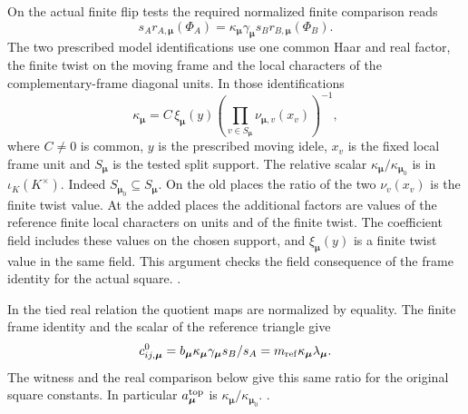 On the actual finite flip tests the required normalized
finite comparison reads
\[
 s_A r_{A,\boldsymbol\mu}(\Phi_A)
   =\kappa_{\boldsymbol\mu}\gamma_{\boldsymbol\mu}
                 s_B r_{B,\boldsymbol\mu}(\Phi_B).
\]
The two prescribed model identifications use one common Haar
and real factor, the finite twist on the moving frame and the
local characters of the complementary-frame diagonal units.
In those identifications
\[
 \kappa_{\boldsymbol\mu}=C\,
   \xi_{\boldsymbol\mu}(y)
   \left(\prod_{v\in S_{\boldsymbol\mu}}
                        \nu_{\boldsymbol\mu,v}(x_v)\right)^{-1},
\]
where \(C\ne0\) is common, \(y\) is the prescribed moving
idele, \(x_v\) is the fixed local frame unit and
\(S_{\boldsymbol\mu}\) is the tested split support.
The relative scalar \(\kappa_{\boldsymbol\mu}/
\kappa_{\boldsymbol\mu_0}\) is in \(\iota_K(K^\times)\).
Indeed \(S_{\boldsymbol\mu_0}\subseteq S_{\boldsymbol\mu}\).
On the old places the ratio of the two \(\nu_v(x_v)\)
is the finite twist value. At the added places the
additional factors are values of the reference finite local
characters on units and of the finite twist. The coefficient
field includes these values on the chosen support, and
\(\xi_{\boldsymbol\mu}(y)\) is a finite twist value in the
same field. This argument checks the field consequence
of the frame identity for the actual square.
.

In the tied real relation the quotient maps are normalized
by equality. The finite frame identity and the scalar
of the reference triangle give
\[
 c^0_{ij,\boldsymbol\mu}
   = b_{\boldsymbol\mu}\kappa_{\boldsymbol\mu}
       \gamma_{\boldsymbol\mu}s_B/s_A
   = m_{\rm ref}\kappa_{\boldsymbol\mu}\lambda_{\boldsymbol\mu}.
\]
The witness and the real comparison below give this
same ratio for the original square constants. In
particular \(a^{\rm top}_{\boldsymbol\mu}\) is
\(\kappa_{\boldsymbol\mu}/\kappa_{\boldsymbol\mu_0}\).
.

